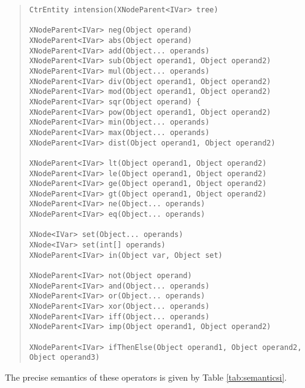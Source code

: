 \documentclass[10pt]{article}
\begin{document}
\begin{quote}
\begin{verbatim}
CtrEntity intension(XNodeParent<IVar> tree) 

XNodeParent<IVar> neg(Object operand) 
XNodeParent<IVar> abs(Object operand) 
XNodeParent<IVar> add(Object... operands) 
XNodeParent<IVar> sub(Object operand1, Object operand2) 
XNodeParent<IVar> mul(Object... operands) 
XNodeParent<IVar> div(Object operand1, Object operand2) 
XNodeParent<IVar> mod(Object operand1, Object operand2) 
XNodeParent<IVar> sqr(Object operand) {
XNodeParent<IVar> pow(Object operand1, Object operand2) 
XNodeParent<IVar> min(Object... operands) 
XNodeParent<IVar> max(Object... operands) 
XNodeParent<IVar> dist(Object operand1, Object operand2) 

XNodeParent<IVar> lt(Object operand1, Object operand2) 
XNodeParent<IVar> le(Object operand1, Object operand2) 
XNodeParent<IVar> ge(Object operand1, Object operand2) 
XNodeParent<IVar> gt(Object operand1, Object operand2) 
XNodeParent<IVar> ne(Object... operands) 
XNodeParent<IVar> eq(Object... operands) 

XNode<IVar> set(Object... operands) 
XNode<IVar> set(int[] operands) 
XNodeParent<IVar> in(Object var, Object set) 

XNodeParent<IVar> not(Object operand) 
XNodeParent<IVar> and(Object... operands) 
XNodeParent<IVar> or(Object... operands) 
XNodeParent<IVar> xor(Object... operands) 
XNodeParent<IVar> iff(Object... operands) 
XNodeParent<IVar> imp(Object operand1, Object operand2) 

XNodeParent<IVar> ifThenElse(Object operand1, Object operand2, Object operand3) 
\end{verbatim}
\end{quote}

The precise semantics of these operators is given by Table \ref{tab:semanticsi}.
\end{document}

